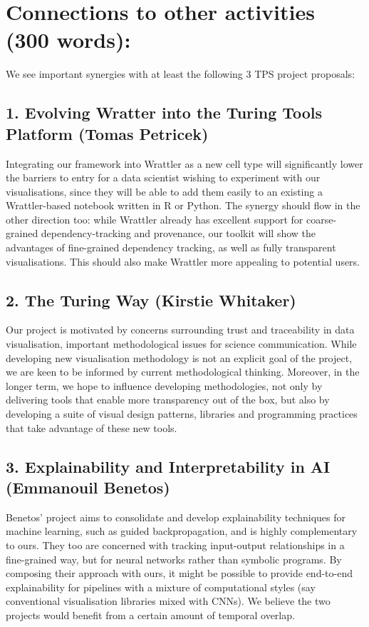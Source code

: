 \section*{Connections to other activities (300 words):}

We see important synergies with at least the following 3 TPS project proposals:

\subsection*{1. Evolving Wratter into the Turing Tools Platform (Tomas Petricek)}

Integrating our framework into Wrattler as a new cell type will significantly
lower the barriers to entry for a data scientist wishing to experiment with our
visualisations, since they will be able to add them easily to an existing a
Wrattler-based notebook written in R or Python. The synergy should flow in the
other direction too: while Wrattler already has excellent support for
coarse-grained dependency-tracking and provenance, our toolkit will show the
advantages of fine-grained dependency tracking, as well as fully transparent
visualisations. This should also make Wrattler more appealing to potential
users.

\subsection*{2. The Turing Way (Kirstie Whitaker)}

Our project is motivated by concerns surrounding trust and traceability in data
visualisation, important methodological issues for science communication. While
developing new visualisation methodology is not an explicit goal of the project,
we are keen to be informed by current methodological thinking. Moreover, in the
longer term, we hope to influence developing methodologies, not only by
delivering tools that enable more transparency out of the box, but also by
developing a suite of visual design patterns, libraries and programming
practices that take advantage of these new tools.

\subsection*{3. Explainability and Interpretability in AI (Emmanouil Benetos)}

Benetos' project aims to consolidate and develop explainability techniques for
machine learning, such as guided backpropagation, and is highly complementary to
ours. They too are concerned with tracking input-output relationships in a
fine-grained way, but for neural networks rather than symbolic programs. By
composing their approach with ours, it might be possible to provide end-to-end
explainability for pipelines with a mixture of computational styles (say
conventional visualisation libraries mixed with CNNs). We believe the two
projects would benefit from a certain amount of temporal overlap.
